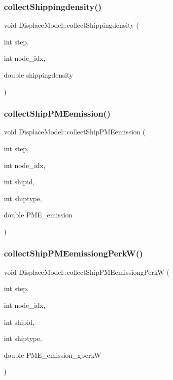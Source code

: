\subsubsection{\texorpdfstring{collectShippingdensity()}{collectShippingdensity()}}
{\footnotesize\ttfamily void Displace\+Model\+::collect\+Shippingdensity (\begin{DoxyParamCaption}\item[{int}]{step,  }\item[{int}]{node\+\_\+idx,  }\item[{double}]{shippingdensity }\end{DoxyParamCaption})}

\mbox{\label{class_displace_model_a546e64f50153726d6603ea4412350a81}} 
\subsubsection{\texorpdfstring{collectShipPMEemission()}{collectShipPMEemission()}}
{\footnotesize\ttfamily void Displace\+Model\+::collect\+Ship\+P\+M\+Eemission (\begin{DoxyParamCaption}\item[{int}]{step,  }\item[{int}]{node\+\_\+idx,  }\item[{int}]{shipid,  }\item[{int}]{shiptype,  }\item[{double}]{P\+M\+E\+\_\+emission }\end{DoxyParamCaption})}

\mbox{\label{class_displace_model_a84a42de30b8f94587c19cf4addb43e55}} 
\subsubsection{\texorpdfstring{collectShipPMEemissiongPerkW()}{collectShipPMEemissiongPerkW()}}
{\footnotesize\ttfamily void Displace\+Model\+::collect\+Ship\+P\+M\+Eemissiong\+PerkW (\begin{DoxyParamCaption}\item[{int}]{step,  }\item[{int}]{node\+\_\+idx,  }\item[{int}]{shipid,  }\item[{int}]{shiptype,  }\item[{double}]{P\+M\+E\+\_\+emission\+\_\+gperkW }\end{DoxyParamCaption})}

